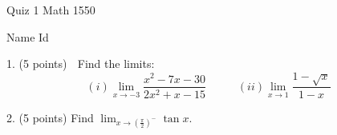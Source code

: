 \documentclass{article}
\begin{document}
\begin{large}
\begin{bf}
\hspace{1.5in}
\parbox{1in}{Quiz 1 \newline Math 1550}
\hspace{1in}
\parbox{1in}{ Name \newline Id}
\end{bf}
\end{large}

 
\vspace{0.3in}
   
1. (5 points) $\;$ Find the limits: 
$$(i) \lim_{x\rightarrow -3} \frac{x^2-7x-30}{2x^2+x-15}\;\;\;\;\;\;\;\;\;\; 
  (ii)\lim_{x\rightarrow 1} \frac{1-\sqrt{x}}{1-x}
$$   
 
  

\vspace{4.in}



2. (5 points) Find  $\lim_{x\rightarrow (\frac{\pi}{2})^-} \tan x $.
  
\end{document}
